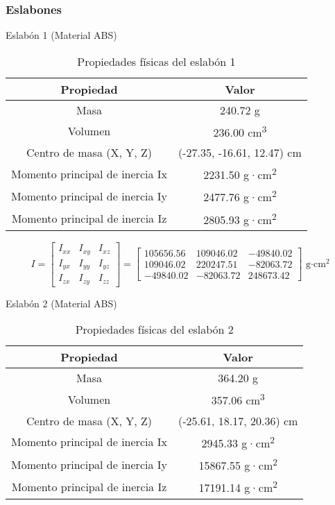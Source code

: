 \subsubsection{Eslabones} \label{subsubsec:eslabones}

{Eslabón 1 (Material ABS)}

\begin{table}[H]
	\centering
	\caption{Propiedades físicas del eslabón 1}
	\begin{tabular}{|c|c|}
		\hline
		\textbf{Propiedad} & \textbf{Valor} \\
		\hline
		Masa & 240.72 g \\
		Volumen & 236.00 cm\textsuperscript{3} \\
		Centro de masa (X, Y, Z) & (-27.35, -16.61, 12.47) cm \\
		Momento principal de inercia Ix & 2231.50 g·cm\textsuperscript{2} \\
		Momento principal de inercia Iy & 2477.76 g·cm\textsuperscript{2} \\
		Momento principal de inercia Iz & 2805.93 g·cm\textsuperscript{2} \\
		\hline
	\end{tabular}
\end{table}


\begin{equation*}
	I =
	\begin{bmatrix}
		I_{xx} & I_{xy} & I_{xz} \\
		I_{yx} & I_{yy} & I_{yz} \\
		I_{zx} & I_{zy} & I_{zz}
	\end{bmatrix}
	=
	\begin{bmatrix}
		105656.56 & 109046.02 & -49840.02 \\
		109046.02 & 220247.51 & -82063.72 \\
		-49840.02 & -82063.72 & 248673.42
	\end{bmatrix}
	\text{ g·cm}^2
\end{equation*}

{Eslabón 2 (Material ABS)}


\begin{table}[H]
	\centering
	\caption{Propiedades físicas del eslabón 2}
	\begin{tabular}{|c|c|}
		\hline
		\textbf{Propiedad} & \textbf{Valor} \\
		\hline
		Masa & 364.20 g \\
		Volumen & 357.06 cm\textsuperscript{3} \\
		Centro de masa (X, Y, Z) & (-25.61, 18.17, 20.36) cm \\
		Momento principal de inercia Ix & 2945.33 g·cm\textsuperscript{2} \\
		Momento principal de inercia Iy & 15867.55 g·cm\textsuperscript{2} \\
		Momento principal de inercia Iz & 17191.14 g·cm\textsuperscript{2} \\
		\hline
	\end{tabular}
\end{table}


